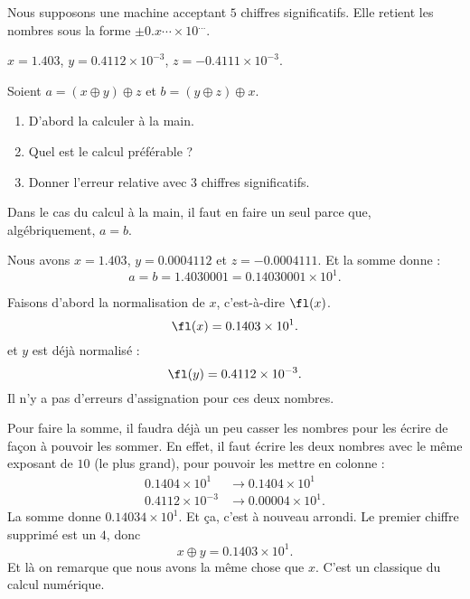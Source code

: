 \begin{example}

	Nous supposons une machine acceptant \( 5\) chiffres significatifs. Elle retient les nombres sous la forme \( \pm 0.x\cdots\times 10^{\ldots}\).

	\( x=1.403\), \( y=0.4112\times 10^{-3}\), \( z=-0.4111\times 10^{-3}\).

	Soient
	\( a=(x\oplus y)\oplus z\) et  \( b=(y\oplus z)\oplus x\).

	\begin{enumerate}
		\item
		      D'abord la calculer à la main.
		\item
		      Quel est le calcul préférable ?
		\item
		      Donner l'erreur relative avec \( 3\) chiffres significatifs.
	\end{enumerate}

	Dans le cas du calcul à la main, il faut en faire un seul parce que, algébriquement, \( a=b\).

	Nous avons \( x=1.403\), \( y=0.0004112\) et \( z=-0.0004111\). Et la somme donne :
	\begin{equation}
		a=b=1.4030001=0.14030001\times 10^1.
	\end{equation}

	Faisons d'abord la normalisation de \( x\), c'est-à-dire \( \fl(x)\).
	\begin{equation}
		\fl(x)=0.1403\times 10^1.
	\end{equation}
	et \( y\) est déjà normalisé :
	\begin{equation}
		\fl(y)=0.4112\times 10^{-3}.
	\end{equation}
	Il n'y a pas d'erreurs d'assignation pour ces deux nombres.

	Pour faire la somme, il faudra déjà un peu casser les nombres pour les écrire de façon à pouvoir les sommer. En effet, il faut écrire les deux nombres avec le même exposant de \( 10\) (le plus grand), pour pouvoir les mettre en colonne :
	\begin{subequations}
		\begin{align}
			0.1404\times 10^1    & \to 0.1404\times 10^1   \\
			0.4112\times 10^{-3} & \to 0.00004\times 10^1.
		\end{align}
	\end{subequations}
	La somme donne \( 0.14034\times 10 ^1\). Et ça, c'est à nouveau arrondi. Le premier chiffre supprimé est un \( 4\), donc
	\begin{equation}
		x\oplus y=0.1403\times 10^1.
	\end{equation}
	Et là on remarque que nous avons la même chose que \( x\). C'est un classique du calcul numérique.


\end{example}
